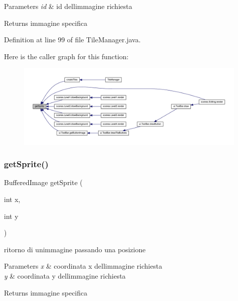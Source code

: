 \begin{DoxyParams}{Parameters}
{\em id} & id dell\textquotesingle{}immagine richiesta\\
\hline
\end{DoxyParams}
\begin{DoxyReturn}{Returns}
immagine specifica 
\end{DoxyReturn}


Definition at line 99 of file Tile\+Manager.\+java.

Here is the caller graph for this function\+:
\nopagebreak
\begin{figure}[H]
\begin{center}
\leavevmode
\includegraphics[width=350pt]{classmanagers_1_1_tile_manager_a46ebd32c7ec4ac506010fe465687bdd7_icgraph}
\end{center}
\end{figure}
\mbox{\label{classmanagers_1_1_tile_manager_a96613c34a7cfb5341cc3c6a4fe3612a1}} 
\subsubsection{\texorpdfstring{get\+Sprite()}{getSprite()}\hspace{0.1cm}{\footnotesize\ttfamily [2/2]}}
{\footnotesize\ttfamily Buffered\+Image get\+Sprite (\begin{DoxyParamCaption}\item[{int}]{x,  }\item[{int}]{y }\end{DoxyParamCaption})\hspace{0.3cm}{\ttfamily [private]}}



ritorno di un\textquotesingle{}immagine passando una posizione 


\begin{DoxyParams}{Parameters}
{\em x} & coordinata x dell\textquotesingle{}immagine richiesta \\
\hline
{\em y} & coordinata y dell\textquotesingle{}immagine richiesta\\
\hline
\end{DoxyParams}
\begin{DoxyReturn}{Returns}
immagine specifica 
\end{DoxyReturn}


